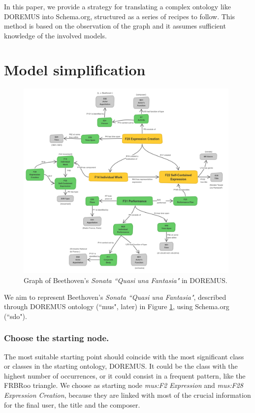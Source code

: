 \documentclass{llncs}
\begin{document}
In this paper, we provide a strategy for translating a complex ontology like DOREMUS into Schema.org, structured as a series of recipes to follow.
This method is based on the observation of the graph and it assumes sufficient knowledge of the involved models.


\section{Model simplification}
\label{sec:simplification}

\begin{figure}
\includegraphics[width=11cm]{img/Beethoven-Doremus.png}
\centering
\caption{Graph of Beethoven's \textit{Sonata ``Quasi una Fantasia"} in DOREMUS.}
\label{fig:beet-doremus}
\end{figure}

We aim to represent Beethoven's \textit{Sonata ``Quasi una Fantasia"}, described through DOREMUS ontology (``mus", later) in Figure \ref{fig:beet-doremus}, using Schema.org (``sdo").

\subsubsection{Choose the starting node.}
The most suitable starting point should coincide with the most significant class or classes in the starting ontology, DOREMUS. It could be the class with the highest number of occurrences, or it could consist in a frequent pattern, like the FRBRoo triangle. We choose as starting node \textit{mus:F2 Expression} and \textit{mus:F28 Expression Creation}, because they are linked with most of the crucial information for the final user, the title and the composer.
\end{document}
